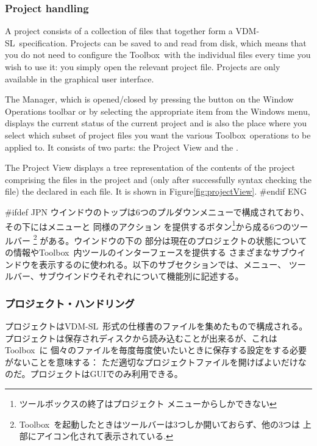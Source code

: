 \documentclass[\pformat,12pt]{article}
\newcommand{\vdmslpp}{VDM-SL}
\newcommand{\Toolbox}{Toolbox}
\newcommand{\vdmslpp}{VDM++}
\newcommand{\Toolbox}{Toolbox}
\newcommand{\guicmd}[1]{{\sf #1}}
\newcommand{\guicmd}[1]{{\gt #1}}
\begin{document}
\subsubsection{Project handling}
A project consists of a collection of files that together form a
\vdmslpp\ specification. Projects can be saved to and read from disk,
which means that you do not need to configure the \Toolbox\ with the
individual files every time you wish to use it: you simply
open the relevant project file. Projects are only available in the
graphical user interface.

The \guicmd{Manager}, which is opened/closed by
pressing the 
button on the \guicmd{Window Operations} toolbar or by
selecting the appropriate item from the \guicmd{Windows} menu,
displays the current status of the current
project and is also  the place where you select which subset of
project files you want the various \Toolbox\ operations to be applied
to. It consists of two parts: the \guicmd{Project View} and the
\ifthenelse{\boolean{VDMsl}}{\guicmd{Module View}}{\guicmd{Class
      View}}.

The \guicmd{Project View} displays a tree representation of the contents
of the project comprising the files in the project and (only after
successfully syntax checking the file) the
 declared in each file. 
It is shown in Figure\ref{fig:projectView}.
#endif ENG

#ifdef JPN
ウインドウのトップは6つのプルダウンメニューで構成されており、その下にはメニューと
同様のアクション を提供するボタン\footnote{ツールボックスの終了は\guicmd{プロジェクト} 
メニューからしかできない}から成る6つのツールバー
\footnote{\Toolbox\ を起動したときはツールバーは3つしか開いておらず、他の3つは
上部にアイコン化されて表示されている.} 
がある。ウインドウの下の
部分は現在のプロジェクトの状態についての情報や\Toolbox\ 内ツールのインターフェースを提供する
さまざまなサブウインドウを表示するのに使われる。以下のサブセクションでは、メニュー、
ツールバー、サブウインドウそれぞれについて機能別に記述する。

\subsubsection{プロジェクト・ハンドリング}
プロジェクトは\vdmslpp\ 形式の仕様書のファイルを集めたもので構成される。
プロジェクトは保存されディスクから読み込むことが出来るが、これは\Toolbox\ に
個々のファイルを毎度毎度使いたいときに保存する設定をする必要がないことを意味する：
ただ適切なプロジェクトファイルを開けばよいだけなのだ。プロジェクトはGUIでのみ利用できる。
\end{document}
